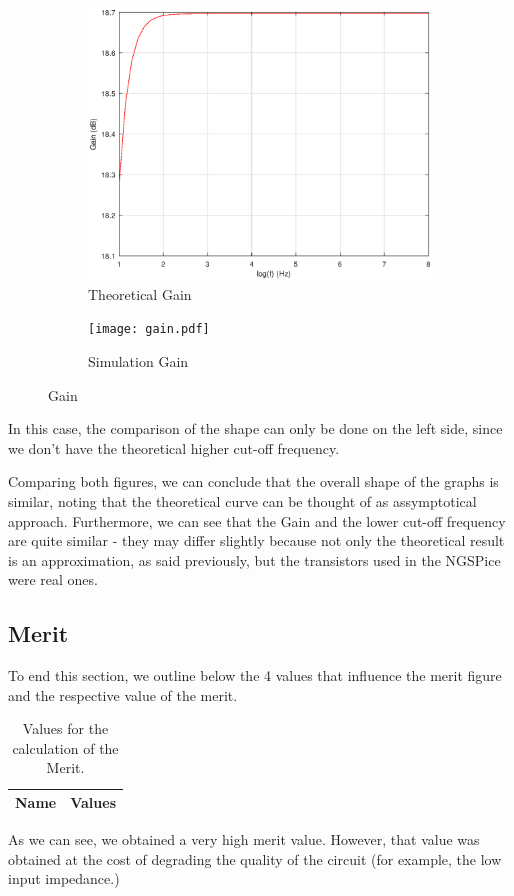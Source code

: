 \begin{figure}[h]
\centering
\begin{subfigure}{.5\textwidth}
    \centering
    \vspace{2.8 cm}
    \includegraphics[scale=0.4]{Gain.eps}
    \caption{Theoretical Gain}
\end{subfigure}%
\begin{subfigure}{.5\textwidth}
    \centering
    \texttt{[image: gain.pdf]}
    \caption{Simulation Gain}
\end{subfigure}
\caption{Gain}
\label{fig:Gain}
\end{figure}

In this case, the comparison of the shape can only be done on the left side, since we don't have the theoretical higher cut-off frequency. 

Comparing both figures, we can conclude that the overall shape of the graphs is similar, noting that the theoretical curve can be thought of as assymptotical approach. Furthermore, we can see that the Gain and the lower cut-off frequency are quite similar - they may differ slightly because not only the theoretical result is an approximation, as said previously, but the transistors used in the NGSPice were real ones.


\subsection{Merit}
To end this section, we outline below the 4 values that influence the merit figure and the respective value of the merit.

\begin{table}[H]
  \centering
  \begin{tabular}{|l|r|}
    \hline    
    {\bf Name} & {\bf Values} \\ \hline
    
  \end{tabular}
  \caption{Values for the calculation of the Merit.}
\end{table}

As we can see, we obtained a very high merit value. However, that value was obtained at the cost of degrading the quality of the circuit (for example, the low input impedance.)


